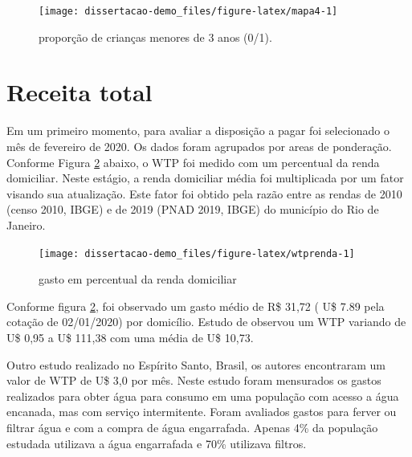 \documentclass[
  12pt,
]{book}
\begin{document}
\begin{figure}

{\centering \texttt{[image: dissertacao-demo\_files/figure-latex/mapa4-1]} 

}

\caption{proporção de crianças menores de 3 anos (0/1).}\label{fig:mapa4}
\end{figure}

\hypertarget{receita-total}{%
\section{Receita total}\label{receita-total}}

Em um primeiro momento, para avaliar a disposição a pagar foi selecionado o mês de fevereiro de 2020. Os dados foram agrupados por areas de ponderação. Conforme Figura \ref{fig:wtprenda} abaixo, o WTP foi medido com um percentual da renda domiciliar. Neste estágio, a renda domiciliar média foi multiplicada por um fator visando sua atualização. Este fator foi obtido pela razão entre as rendas de 2010 (censo 2010, IBGE) e de 2019 (PNAD 2019, IBGE) do município do Rio de Janeiro.

\begin{figure}

{\centering \texttt{[image: dissertacao-demo\_files/figure-latex/wtprenda-1]} 

}

\caption{gasto em percentual da renda domiciliar}\label{fig:wtprenda}
\end{figure}

Conforme figura \ref{fig:wtprenda}, foi observado um gasto médio de R\$ 31,72 ( U\$ 7.89 pela cotação de 02/01/2020) por domicílio. Estudo de \citet{wtpmalawi} observou um WTP variando de U\$ 0,95 a U\$ 111,38 com uma média de U\$ 10,73.

Outro estudo realizado no Espírito Santo, Brasil, \citep{wtpespiritosanto} os autores encontraram um valor de WTP de U\$ 3,0 por mês. Neste estudo foram mensurados os gastos realizados para obter água para consumo em uma população com acesso a água encanada, mas com serviço intermitente. Foram avaliados gastos para ferver ou filtrar água e com a compra de água engarrafada. Apenas 4\% da população estudada utilizava a água engarrafada e 70\% utilizava filtros.
\end{document}
